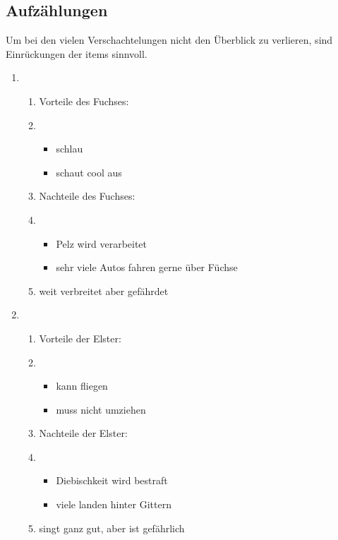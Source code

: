 \documentclass[a4paper, pdftex, ngerman, 11pt]{article}
\begin{document}
\subsection{Aufzählungen}
Um bei den vielen Verschachtelungen nicht den Überblick zu verlieren, sind Einrückungen der items sinnvoll.
\begin{enumerate}
  \item 
  \begin{enumerate}
    \item Vorteile des Fuchses:
    \item
    \begin{itemize}
      \item schlau
      \item schaut cool aus
    \end{itemize}
    \item Nachteile des Fuchses:
    \item
    \begin{itemize}
      \item Pelz wird verarbeitet
      \item sehr viele Autos fahren gerne über Füchse
    \end{itemize}
    \item weit verbreitet aber gefährdet
  \end{enumerate}
  \item
  \begin{enumerate}
    \item Vorteile der Elster:
    \item
    \begin{itemize}
      \item kann fliegen
      \item muss nicht umziehen
    \end{itemize}
    \item Nachteile der Elster:
    \item
    \begin{itemize}
      \item Diebischkeit wird bestraft
      \item viele landen hinter Gittern
    \end{itemize}
      \item singt ganz gut, aber ist gefährlich
  \end{enumerate}
\end{enumerate}
\end{document}
